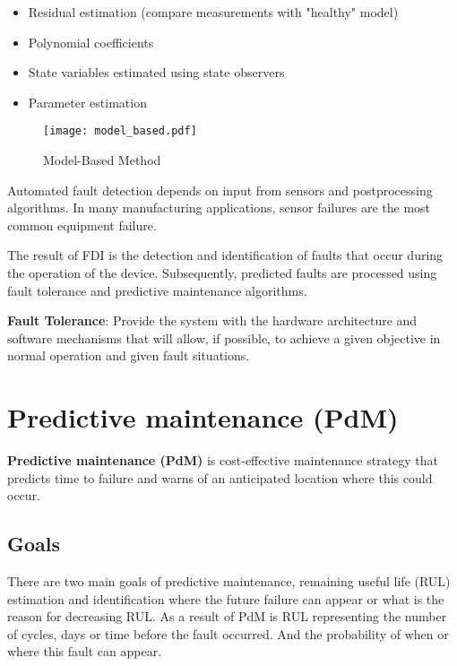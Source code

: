 \begin{itemize}
    \item Residual estimation (compare measurements with "healthy" model)
    \item Polynomial coefficients
    \item State variables estimated using state observers
    \item Parameter estimation
\end{itemize}

\begin{figure}[h!]
    \centering
    \texttt{[image: model\_based.pdf]}
    \caption{Model-Based Method}
    \label{fig:model_based}
\end{figure}


Automated fault detection depends on input from sensors and postprocessing
algorithms. In many manufacturing applications, sensor failures are the
most common equipment failure.


The result of FDI is the detection and identification of faults that occur
during the operation of the device. Subsequently, predicted faults are
processed using fault tolerance and predictive maintenance algorithms.

\textbf{Fault Tolerance}: Provide the system with the hardware architecture
and software mechanisms that will allow, if possible, to achieve a given
objective in normal operation and given fault situations.

% 


\section{Predictive maintenance (PdM)}
\textbf{Predictive maintenance (PdM)} is cost-effective maintenance strategy that
predicts time to failure and warns of an anticipated location where this
could occur.

\subsection{Goals}
There are two main goals of predictive maintenance,  remaining useful life
(RUL) estimation and identification where the future failure can appear or
what is the reason for decreasing RUL.  As a result of PdM is RUL
representing the number of cycles, days or time before the fault occurred.
And the probability of when or where this fault can appear. 

